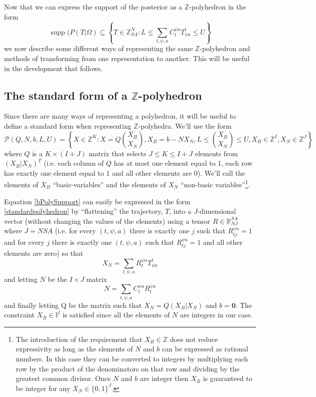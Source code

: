 \documentclass{article}
\DeclareMathOperator\supp{supp}
\begin{document}
Now that we can express the support of the posterior as a $\mathbb{Z}$-polyhedron in the form
\begin{equation}
\supp(P(T|\Omega) \subseteq \left\{T \in \mathbb{Z}^N_{SA}: L \le \sum_{t,\psi,a} C^{\psi a}_t T^t_{\psi a} \le U \right\}
\label{bPolySupport}
\end{equation}
we now describe some different ways of representing the same $\mathbb{Z}$-polyhedron and methods of transforming from one representation to another. This will be useful in the development that follows.

\subsection{The standard form of a $\mathbb{Z}$-polyhedron}

Since there are many ways of representing a polyhedron, it will be useful to define a standard form when representing $\mathbb{Z}$-polyhedra. We'll use the form
\begin{equation}
\mathcal{P}(Q,N,b,L,U) = \left\{X \in \mathbb{Z}^K: X = Q{X_B\choose X_N}, X_B = b - NX_N, L \le {X_B\choose X_N} \le U, X_B\in\mathbb{Z}^I, X_N \in \mathbb{Z}^J \right\}
\label{standardpolyhedron}
\end{equation}
where $Q$ is a $K\times (I+J)$ matrix that selects $J \le K \le I+J$ elements from $(X_B|X_N)^T$ (i.e. each column of $Q$ has at most one element equal to 1, each row has exactly one element equal to 1 and all other elements are 0). We'll call the elements of $X_B$ ``basic-variables'' and the elements of $X_N$ ``non-basic variables''\footnote{The introduction of the requirement that $X_B \in \mathbb{Z}$ does not reduce expressivity as long as the elements of $N$ and $b$ can be expressed as rational numbers. In this case they can be converted to integers by multiplying each row by the product of the denominators on that row and dividing by the greatest common divisor. Once $N$ and $b$ are integer then $X_B$ is guaranteed to be integer for any $X_N\in\{0,1\}^J$.}.

Equation \eqref{bPolySupport} can easily be expressed in the form \eqref{standardpolyhedron} by ``flattening'' the trajectory, $T$, into a $J$-dimensional vector (without changing the values of the elements) using a tensor $R\in\mathbb{R}^{SA}_{NJ}$ where $J=NSA$ (i.e. for every $(t, \psi, a)$ there is exactly one $j$ such that $R^{\psi a}_{t j} = 1$ and for every $j$ there is exactly one $(t,\psi,a)$ such that $R^{\psi a}_{t j} = 1$ and all other elements are zero) so that
\[
X_N = \sum_{t,\psi,a}R^{\psi a}_t T^t_{\psi a}
\]
and letting $N$ be the $I\times J$ matrix
\[
N = \sum_{t,\psi,a} C^{\psi a}_t R^{\psi a}_t
\]
and finally letting Q be the matrix such that $X_N = Q(X_B|X_N)$ and $b = \mathbf{0}$. The constraint $X_B\in\mathbb{I}^I$ is satisfied since all the elements of $N$ are integers in our case.
\end{document}
